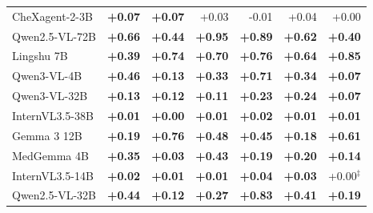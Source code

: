 \documentclass{article}
\begin{document}
\begin{table}[htbp]
{\begin{tabular}{lrrrrrr}
CheXagent-2-3B & \cellcolor{cfTerra2}\textbf{+0.07} & \cellcolor{cfTerra2}\textbf{+0.07} & \cellcolor{cfTerra2}+0.03 & \cellcolor{cfSlate1}-0.01 & \cellcolor{cfTerra2}+0.04 & \cellcolor{cfTerra1}+0.00 \\
Qwen2.5-VL-72B & \cellcolor{cfTerra4}\textbf{+0.66} & \cellcolor{cfTerra4}\textbf{+0.44} & \cellcolor{cfTerra4}\textbf{+0.95} & \cellcolor{cfTerra4}\textbf{+0.89} & \cellcolor{cfTerra4}\textbf{+0.62} & \cellcolor{cfTerra4}\textbf{+0.40} \\
Lingshu 7B & \cellcolor{cfTerra4}\textbf{+0.39} & \cellcolor{cfTerra4}\textbf{+0.74} & \cellcolor{cfTerra4}\textbf{+0.70} & \cellcolor{cfTerra4}\textbf{+0.76} & \cellcolor{cfTerra4}\textbf{+0.64} & \cellcolor{cfTerra4}\textbf{+0.85} \\
Qwen3-VL-4B & \cellcolor{cfTerra4}\textbf{+0.46} & \cellcolor{cfTerra3}\textbf{+0.13} & \cellcolor{cfTerra4}\textbf{+0.33} & \cellcolor{cfTerra4}\textbf{+0.71} & \cellcolor{cfTerra4}\textbf{+0.34} & \cellcolor{cfTerra2}\textbf{+0.07} \\
Qwen3-VL-32B & \cellcolor{cfTerra3}\textbf{+0.13} & \cellcolor{cfTerra3}\textbf{+0.12} & \cellcolor{cfTerra3}\textbf{+0.11} & \cellcolor{cfTerra3}\textbf{+0.23} & \cellcolor{cfTerra3}\textbf{+0.24} & \cellcolor{cfTerra2}\textbf{+0.07} \\
InternVL3.5-38B & \cellcolor{cfTerra1}\textbf{+0.01} & \cellcolor{cfTerra1}\textbf{+0.00} & \cellcolor{cfTerra1}\textbf{+0.01} & \cellcolor{cfTerra1}\textbf{+0.02} & \cellcolor{cfTerra1}\textbf{+0.01} & \cellcolor{cfTerra1}\textbf{+0.01} \\
Gemma 3 12B & \cellcolor{cfTerra3}\textbf{+0.19} & \cellcolor{cfTerra4}\textbf{+0.76} & \cellcolor{cfTerra4}\textbf{+0.48} & \cellcolor{cfTerra4}\textbf{+0.45} & \cellcolor{cfTerra3}\textbf{+0.18} & \cellcolor{cfTerra4}\textbf{+0.61} \\
MedGemma 4B & \cellcolor{cfTerra4}\textbf{+0.35} & \cellcolor{cfTerra2}\textbf{+0.03} & \cellcolor{cfTerra4}\textbf{+0.43} & \cellcolor{cfTerra3}\textbf{+0.19} & \cellcolor{cfTerra3}\textbf{+0.20} & \cellcolor{cfTerra3}\textbf{+0.14} \\
InternVL3.5-14B & \cellcolor{cfTerra1}\textbf{+0.02} & \cellcolor{cfTerra1}\textbf{+0.01} & \cellcolor{cfTerra1}\textbf{+0.01} & \cellcolor{cfTerra2}\textbf{+0.04} & \cellcolor{cfTerra2}\textbf{+0.03} & \cellcolor{cfTerra1}+0.00$^{\ddagger}$ \\
Qwen2.5-VL-32B & \cellcolor{cfTerra4}\textbf{+0.44} & \cellcolor{cfTerra3}\textbf{+0.12} & \cellcolor{cfTerra4}\textbf{+0.27} & \cellcolor{cfTerra4}\textbf{+0.83} & \cellcolor{cfTerra4}\textbf{+0.41} & \cellcolor{cfTerra3}\textbf{+0.19} \\

\end{tabular}}
\end{table}
\end{document}
